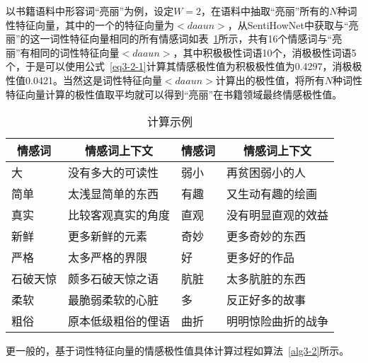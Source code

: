 以书籍语料中形容词“亮丽”为例，设定$ W=2 $，在语料中抽取“亮丽”所有的$ N $种词性特征向量，其中的一个的特征向量为$ <daaun> $，从SentiHowNet中获取与“亮丽”的这一词性特征向量相同的所有情感词如表~\ref{tab3-3-1}所示，共有16个情感词与“亮丽”有相同的词性特征向量$ <daaun> $，其中积极极性词语10个，消极极性词语5个，于是可以使用公式~\ref{eq3-2-1}计算其情感极性值为积极极性值为0.4297，消极极性值0.0421。当然这是词性特征向量$ <daaun> $计算出的极性值，将所有$ N $种词性特征向量计算的极性值取平均就可以得到“亮丽”在书籍领域最终情感极性值。
\begin{table}[htp]
\centering
\caption{计算示例}
\label{tab3-3-1}
\begin{tabular}{|l|l|l|l|}
\hline
\multicolumn{1}{|c|}{情感词} & \multicolumn{1}{c|}{情感词上下文} & \multicolumn{1}{c|}{情感词} & \multicolumn{1}{c|}{情感词上下文} \\ \hline
大 & 没有多大的可读性 & 弱小 & 再贫困弱小的人 \\ \hline
简单 & 太浅显简单的东西 & 有趣 & 又生动有趣的绘画 \\ \hline
真实 & 比较客观真实的角度 & 直观 & 没有明显直观的效益 \\ \hline
新鲜 & 更多新鲜的元素 & 奇妙 & 更多奇妙的东西 \\ \hline
严格 & 太多严格的界限 & 好 & 更多好的作品 \\ \hline
石破天惊 & 颇多石破天惊之语 & 肮脏 & 太多肮脏的东西 \\ \hline
柔软 & 最脆弱柔软的心脏 & 多 & 反正好多的故事 \\ \hline
粗俗 & 原本低级粗俗的俚语 & 曲折 & 明明惊险曲折的战争 \\ \hline
\end{tabular}
\end{table}

更一般的，基于词性特征向量的情感极性值具体计算过程如算法~\ref{alg3-2}所示。

